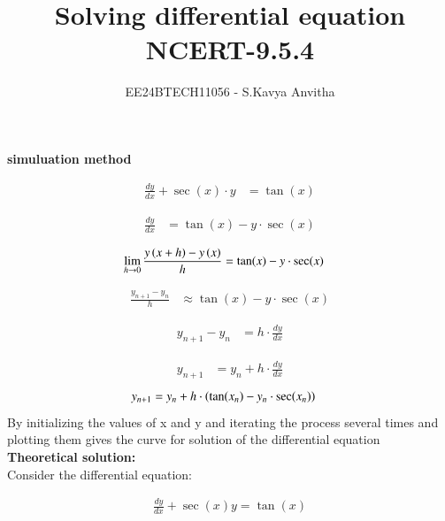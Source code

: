 \documentclass[journal]{IEEEtran}
\begin{document}

\vspace{3cm}

\title{Solving differential equation\\NCERT-9.5.4}
\author{EE24BTECH11056 - S.Kavya Anvitha}
\maketitle
\bigskip

\renewcommand{\thefigure}{\theenumi}
\renewcommand{\thetable}{\theenumi}
\textbf{simuluation method}

\begin{align}
\frac{dy}{dx} + \sec(x) \cdot y &= \tan(x)
\end{align}

\begin{align}
\frac{dy}{dx} &= \tan(x) - y \cdot \sec(x)
\end{align}

\begin{align}
\lim_{h \to 0} \frac{y\left(x+h\right) - y\left(x\right)}{h} &= \tan(x) - y \cdot \sec(x)
\end{align}

\begin{align}
\frac{y_{n+1} - y_n}{h} &\approx \tan(x) - y \cdot \sec(x)
\end{align}

\begin{align}
y_{n+1} - y_n &= h \cdot \frac{dy}{dx}
\end{align}

\begin{align}
y_{n+1} &= y_n + h \cdot \frac{dy}{dx}
\end{align}
\begin{align}
y_{n+1} &= y_n + h \cdot \left(\tan(x_n) - y_n \cdot \sec(x_n)\right)
\end{align}
By initializing the values of x and y and iterating the process several times 
and plotting them gives the curve for solution of the differential equation\\

\textbf{Theoretical solution:}\\
Consider the differential equation:

\begin{align}
\frac{dy}{dx} + \sec(x)y = \tan(x)
\end{align}
\end{document}
